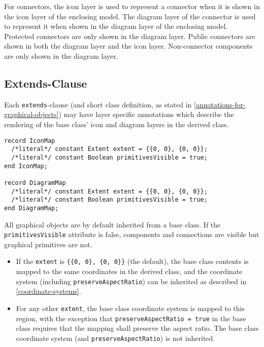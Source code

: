 For connectors, the icon layer is used to represent a connector when it is shown in the icon layer of the enclosing model.
The diagram layer of the connector is used to represent it when shown in the diagram layer of the enclosing model.
Protected connectors are only shown in the diagram layer.
Public connectors are shown in both the diagram layer and the icon layer.
Non-connector components are only shown in the diagram layer.

\subsection{Extends-Clause}\label{extends-clause}

Each \lstinline!extends!-clause (and short class definition, as stated in \cref{annotations-for-graphical-objects}) may have layer specific annotations which describe the rendering of the base class' icon and diagram layers in the derived class.

\begin{lstlisting}[language=modelica]
record IconMap
  /*literal*/ constant Extent extent = {{0, 0}, {0, 0}};
  /*literal*/ constant Boolean primitivesVisible = true;
end IconMap;

record DiagramMap
  /*literal*/ constant Extent extent = {{0, 0}, {0, 0}};
  /*literal*/ constant Boolean primitivesVisible = true;
end DiagramMap;
\end{lstlisting}%
All graphical objects are by default inherited from a base class.
If the \lstinline!primitivesVisible! attribute is false, components and connections are visible but graphical primitives are not.

\begin{itemize}
\item
  If the \lstinline!extent! is \lstinline!{{0, 0}, {0, 0}}! (the default), the base class contents is mapped to the same coordinates in the derived class, and the coordinate system (including \lstinline!preserveAspectRatio!) can be inherited as described in \cref{coordinate-systems}.
\item
  For any other \lstinline!extent!, the base class coordinate system is mapped to this region, with the exception that \lstinline!preserveAspectRatio = true! in the base class requires that the mapping shall preserve the aspect ratio.
  The base class coordinate system (and \lstinline!preserveAspectRatio!) is not inherited.
\end{itemize}

